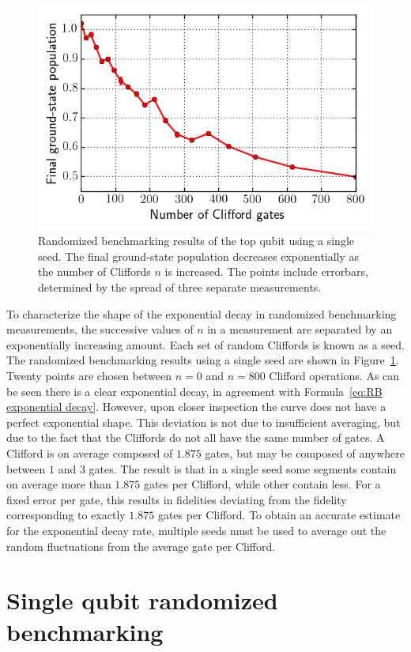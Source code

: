       \begin{figure}[tb]
        \centering
        \includegraphics[width=.6\textwidth]{../Figures/Randomized benchmarking/RB_single_seed.png}
        \caption{Randomized benchmarking results of the top qubit using a single seed. The final ground-state population decreases exponentially as the number of Cliffords $n$ is increased. The points include errorbars, determined by the spread of three separate measurements.}
        \label{fig:RB single seed}
      \end{figure}

      To characterize the shape of the exponential decay in randomized benchmarking measurements, the successive values of $n$ in a measurement are separated by an exponentially increasing amount. Each set of random Cliffords is known as a seed. The randomized benchmarking results using a single seed are shown in Figure~\ref{fig:RB single seed}. Twenty points are chosen between $n=0$ and $n=800$ Clifford operations. As can be seen there is a clear exponential decay, in agreement with Formula~\ref{eq:RB exponential decay}. However, upon closer inspection the curve does not have a perfect exponential shape. This deviation is not due to insufficient averaging, but due to the fact that the Cliffords do not all have the same number of gates. A Clifford is on average composed of $1.875$ gates, but may be composed of anywhere between $1$ and $3$ gates. The result is that in a single seed some segments contain on average more than $1.875$ gates per Clifford, while other contain less. For a fixed error per gate, this results in fidelities deviating from the fidelity corresponding to exactly $1.875$ gates per Clifford. To obtain an accurate estimate for the exponential decay rate, multiple seeds must be used to average out the random fluctuations from the average gate per Clifford.

    \section{Single qubit randomized benchmarking}
      \label{sec:Single qubit randomized benchmarking}
